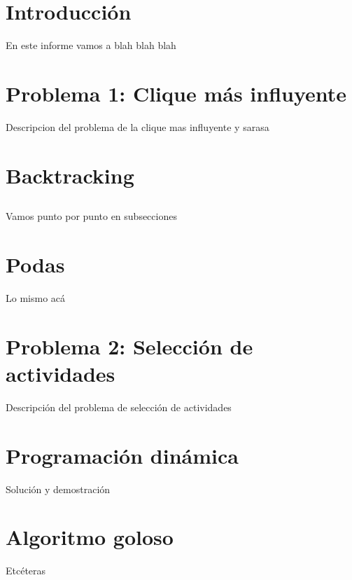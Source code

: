 \documentclass[10pt, a4paper]{article}
\begin{document}


\maketitle


\section*{Introducción}

En este informe vamos a blah blah blah

\section*{Problema 1: Clique más influyente}

Descripcion del problema de la clique mas influyente y sarasa

\section{Backtracking}

\subsection{}
Vamos punto por punto en subsecciones

\section{Podas}
Lo mismo acá

\section*{Problema 2: Selección de actividades}
Descripción del problema de selección de actividades

\section{Programación dinámica}
Solución y demostración

\section{Algoritmo goloso}
Etcéteras
\end{document}

